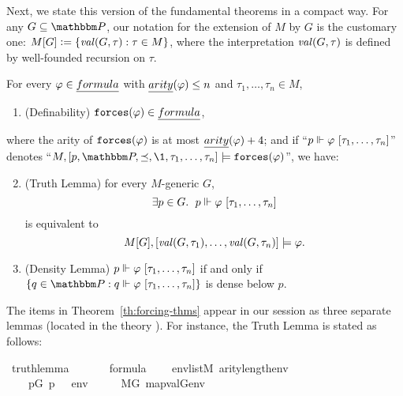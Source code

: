 Next, we state this version of the fundamental theorems in a compact
way. For any $G\subseteq \PP$, our notation for the extension of $M$ by
$G$ is the  customary one: $M[G]\mathrel{\mathop:}=
\{ \operatorname{\mathit{val}}(G,\tau) : \tau\in M \}$, where the interpretation
$\operatorname{\mathit{val}}(G,\tau)$ is defined by well-founded recursion on
$\tau$.

\begin{theorem}\label{th:forcing-thms}
  For every
  $\phi\in\formula$ with $\isa{arity}(\phi)\leq n$ and $\tau_1,\dots,\tau_n\in M$,
  \begin{enumerate}
  \item\label{item:definability} (Definability)
    $\forceisa(\phi)\in\formula$, 
  \end{enumerate}
  where the 
  arity of $\mathop{\mathtt{forces}}(\varphi)$ is at most $\isa{arity}(\phi) + 4$; and if
  “$p \forces \phi\ [\tau_1,\dots,\tau_n]$”
  denotes
  “$M, [p,\PP,\preceq,\1, \tau_1,\dots,\tau_n]  \models
  \forceisa(\phi)$”, we have:
  \begin{enumerate}
    \setcounter{enumi}{1}
  \item\label{item:truth-lemma} (Truth Lemma) for every $M$-generic $G$,
    \[
      \exists p\in G.\ \; p \forces \phi\ [\tau_1,\dots,\tau_n]
    \]
    is equivalent to 
    \[
      M[G], [\operatorname{\mathit{val}}(G,\tau_1),\dots,\operatorname{\mathit{val}}(G,\tau_n)]
      \models \varphi.
    \]
  \item \label{item:density-lemma} (Density Lemma) $p \forces \phi\ [\tau_1,\dots,\tau_n]$
    if and only if 
    $\{q\in \PP :  q \forces \phi\ [\tau_1,\dots,\tau_n]\}$
    is dense below $p$.
  \end{enumerate}
\end{theorem}
The items in Theorem~\ref{th:forcing-thms} appear in our
 session \cite{Independence_CH-AFP} as three
separate lemmas (located in the theory
).
For instance, the Truth Lemma is stated as
follows:
\begin{isabelle}
\isamarkupfalse%
\ truth{\isacharunderscore}{\kern0pt}lemma{\isacharcolon}{\kern0pt}\isanewline
\ \ \isanewline
\ \ \ \ {\isachardoublequoteopen}{\isasymphi}{\isasymin}formula{\isachardoublequoteclose}\isanewline
\ \ \ \ {\isachardoublequoteopen}env{\isasymin}list{\isacharparenleft}{\kern0pt}M{\isacharparenright}{\kern0pt}{\isachardoublequoteclose}\ {\isachardoublequoteopen}arity{\isacharparenleft}{\kern0pt}{\isasymphi}{\isacharparenright}{\kern0pt}{\isasymle}length{\isacharparenleft}{\kern0pt}env{\isacharparenright}{\kern0pt}{\isachardoublequoteclose}\isanewline
\ \ \isanewline
\ \ \ \ {\isachardoublequoteopen}{\isacharparenleft}{\kern0pt}{\isasymexists}p{\isasymin}G{\isachardot}{\kern0pt}\ p\ {\isasymtturnstile}\ {\isasymphi}\ env{\isacharparenright}{\kern0pt}\ \ \ {\isasymlongleftrightarrow}\ \ \ M{\isacharbrackleft}{\kern0pt}G{\isacharbrackright}{\kern0pt}{\isacharcomma}{\kern0pt}\ map{\isacharparenleft}{\kern0pt}val{\isacharparenleft}{\kern0pt}G{\isacharparenright}{\kern0pt}{\isacharcomma}{\kern0pt}env{\isacharparenright}{\kern0pt}\ {\isasymTurnstile}\ {\isasymphi}{\isachardoublequoteclose}
\end{isabelle}
